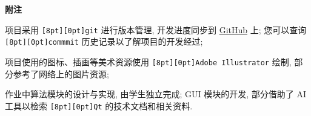 \documentclass{ctexart}
\newcommand{\subtitletext}[1]{{\fontsize{16}{16} \textbf{#1} \vspace*{1ex}}}
\newcommand{\codebox}[1]{\colorbox[rgb]{0.9, 0.9, 0.9}{\texttt{\raisebox{0pt}[8pt][0pt]{#1}}}}
\begin{document}
\subtitletext{附注}

项目采用 \codebox{git} 进行版本管理, 开发进度同步到 \href{https://github.com/lastrivia/Coursework_Calc24}{GitHub} 上;
您可以查询 \codebox{commmit} 历史记录以了解项目的开发经过; 

项目使用的图标、插画等美术资源使用 \codebox{Adobe Illustrator} 绘制, 部分参考了网络上的图片资源;

作业中算法模块的设计与实现, 由学生独立完成; GUI 模块的开发, 部分借助了 AI 工具以检索 \codebox{Qt} 的技术文档和相关资料.
\end{document}
